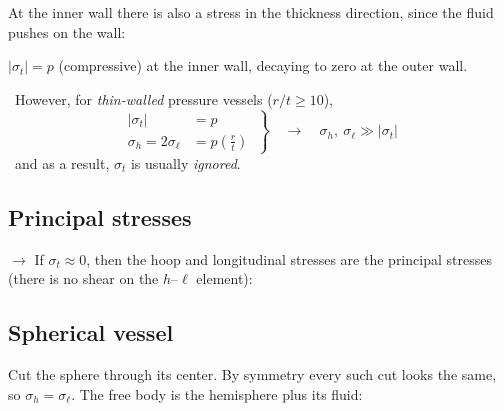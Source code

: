 \documentclass[11pt]{article}
\begin{document}
At the inner wall there is also a stress in the thickness direction, since the fluid
pushes on the wall:

\begin{center}
\end{center}

\noindent
$|\sigma_t| = p$ (compressive) at the inner wall, decaying to zero at the outer wall.

\medskip\noindent
\then\ However, for \emph{thin-walled} pressure vessels ($r/t \ge 10$),
\[
  \left.
  \begin{aligned}
    |\sigma_t| &= p \\
    \sigma_h = 2\sigma_\ell &= p\left(\frac{r}{t}\right)
  \end{aligned}
  \ \right\}
  \quad\rightarrow\quad
  \boxed{\sigma_h,\ \sigma_\ell \gg |\sigma_t|}
\]
\then\ and as a result, $\sigma_t$ is usually \emph{ignored}.

\subsection*{Principal stresses}

$\rightarrow$ If $\sigma_t \approx 0$, then the hoop and longitudinal stresses are the
principal stresses (there is no shear on the $h$--$\ell$ element):
\begin{center}
\end{center}

\subsection*{Spherical vessel}

Cut the sphere through its center. By symmetry every such cut looks the same, so
$\sigma_h = \sigma_\ell$. The free body is the hemisphere plus its fluid:
\end{document}
